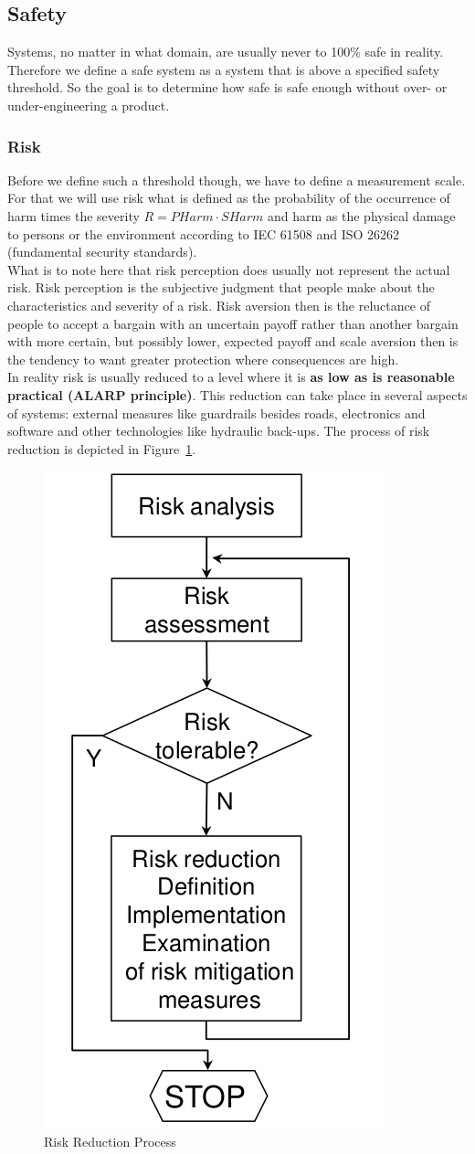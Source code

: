 \subsection{Safety}
Systems, no matter in what domain, are usually never to 100\% safe in reality.
Therefore we define a safe system as a system that is above a specified safety threshold.
So the goal is to determine how safe is safe enough without over- or under-engineering a product.

\subsubsection*{Risk}
Before we define such a threshold though, we have to define a measurement scale.
For that we will use risk what is defined as the probability of the occurrence of harm times the severity $R = PHarm \cdot SHarm$ and harm as the physical damage to persons or the environment according to IEC 61508 and ISO 26262 (fundamental security standards).\\
What is to note here that risk perception does usually not represent the actual risk.
Risk perception is the subjective judgment that people make about the characteristics and severity of a risk.
Risk aversion then is the reluctance of people to accept a bargain with an uncertain payoff rather than another bargain with more certain, but possibly lower, expected payoff and scale aversion then is the tendency to want greater protection where consequences are high.\\

In reality risk is usually reduced to a level where it is \textbf{as low as is reasonable practical (ALARP principle)}.
This reduction can take place in several aspects of systems: external measures like guardrails besides roads, electronics and software and other technologies like hydraulic back-ups.
The process of risk reduction is depicted in Figure~\ref{fig:risk_reduction_process}.\\
\begin{figure}[H]
  \centering
  \includegraphics[width=.2\textwidth]{images/risk_reduction_process.png}
  \caption{Risk Reduction Process}\label{fig:risk_reduction_process}
\end{figure}

